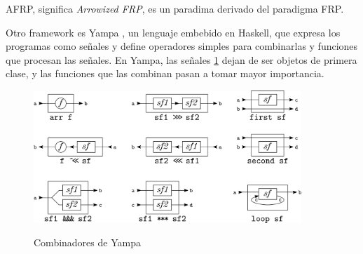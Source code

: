 
  AFRP, significa \textit{Arrowized FRP}, es un paradima derivado del
paradigma FRP.

  Otro framework es Yampa \cite{yampa},
un lenguaje embebido en Haskell, que expresa los programas como señales y
define operadores simples para combinarlas y funciones que
procesan las señales.
En Yampa, las señales \ref{fig:arrowcombinators} dejan de ser objetos de primera clase,
y las funciones que las combinan pasan a tomar mayor importancia.

\begin{figure}[h]
\begin{center}
\caption{Combinadores de Yampa}
\includegraphics[width=0.9\textwidth]{graphs/yampasf.png}
\label{fig:arrowcombinators}
\end{center}
\end{figure}


